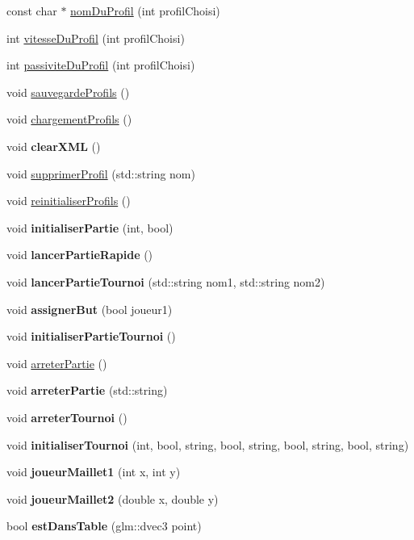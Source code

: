 \begin{DoxyCompactItemize}
\item 
const char $\ast$ \hyperlink{group__inf2990_ga48f8514c50e91412a9a5f8b1b31608c4}{nom\+Du\+Profil} (int profil\+Choisi)
\item 
int \hyperlink{group__inf2990_gae52e8b966494531bb39eeaf38fbe835d}{vitesse\+Du\+Profil} (int profil\+Choisi)
\item 
int \hyperlink{group__inf2990_gad374d0e071223157ade5a26000147fee}{passivite\+Du\+Profil} (int profil\+Choisi)
\item 
void \hyperlink{group__inf2990_ga5790b64f21bda18cb0bfbb7fd9d3f178}{sauvegarde\+Profils} ()
\item 
void \hyperlink{group__inf2990_gaf4d9550852335d55a5196893444d159f}{chargement\+Profils} ()
\item 
void {\bfseries clear\+X\+ML} ()
\item 
void \hyperlink{group__inf2990_ga1feb4072d211b61f86f1ed2d499ca3c3}{supprimer\+Profil} (std\+::string nom)
\item 
void \hyperlink{group__inf2990_gad015b5798cb7e60834c44233d147d166}{reinitialiser\+Profils} ()
\item 
void {\bfseries initialiser\+Partie} (int, bool)
\item 
void {\bfseries lancer\+Partie\+Rapide} ()
\item 
void {\bfseries lancer\+Partie\+Tournoi} (std\+::string nom1, std\+::string nom2)
\item 
void {\bfseries assigner\+But} (bool joueur1)
\item 
void {\bfseries initialiser\+Partie\+Tournoi} ()
\item 
void \hyperlink{group__inf2990_ga4a9b8ae1fda44aaff19b1c31c87cd35e}{arreter\+Partie} ()
\item 
void {\bfseries arreter\+Partie} (std\+::string)
\item 
void {\bfseries arreter\+Tournoi} ()
\item 
void {\bfseries initialiser\+Tournoi} (int, bool, string, bool, string, bool, string, bool, string)
\item 
void {\bfseries joueur\+Maillet1} (int x, int y)
\item 
void {\bfseries joueur\+Maillet2} (double x, double y)
\item 
\hypertarget{class_facade_modele_ab84cc5f6238eefd8c51f4febecffb09f}{}\label{class_facade_modele_ab84cc5f6238eefd8c51f4febecffb09f} 
bool {\bfseries est\+Dans\+Table} (glm\+::dvec3 point)
\item 
\hypertarget{class_facade_modele_ae7433a430200451b6353d3cb96e3cb7f}{}\label{class_facade_modele_ae7433a430200451b6353d3cb96e3cb7f} 

\end{DoxyCompactItemize}
